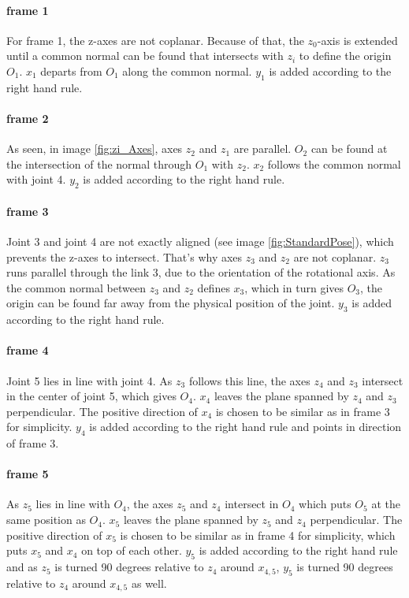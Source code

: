 \paragraph{frame 1}
For frame 1, the z-axes are not coplanar. 
Because of that, the  $z_0$-axis is extended until a common normal can be found that intersects with $z_i$ to define the origin $O_1$.
$x_1$ departs from $O_1$ along the common normal.
$y_1$ is added according to the right hand rule.

\paragraph{frame 2}
As seen, in image \ref{fig:zi_Axes}, axes $z_2$ and $z_1$ are parallel. $O_2$ can be found at the intersection of the normal through $O_1$ with $z_2$. $x_2$ follows the common normal with joint 4.
$y_2$ is added according to the right hand rule.

\paragraph{frame 3}
Joint 3 and joint 4 are not exactly aligned (see image \ref{fig:StandardPose}), which prevents the z-axes to intersect. That's why axes $z_3$ and $z_2$ are not coplanar. 
$z_3$ runs parallel through the link 3, due to the orientation of the rotational axis.
As the common normal between $z_3$ and $z_2$ defines $x_3$, which in turn gives $O_3$, the origin can be found far away from the physical position of the joint.
$y_3$ is added according to the right hand rule.

\paragraph{frame 4}
Joint 5 lies in line with joint 4.
As $z_3$ follows this line, the axes  $z_4$ and $z_3$ intersect in the center of joint 5, which gives $O_4$. 
$x_4$ leaves the plane spanned by  $z_4$ and $z_3$ perpendicular.
The positive direction of $x_4$ is chosen to be similar as in frame 3 for simplicity.
$y_4$ is added according to the right hand rule and points in direction of frame 3.

\paragraph{frame 5}
As $z_5$ lies  in line with $O_4$, the axes  $z_5$ and $z_4$ intersect in $O_4$ which puts $O_5$ at the same position as $O_4$.
$x_5$ leaves the plane spanned by  $z_5$ and $z_4$ perpendicular.
The positive direction of $x_5$ is chosen to be similar as in frame 4 for simplicity, which puts $x_5$ and $x_4$ on top of each other. 
$y_5$ is added according to the right hand rule and as $z_5$ is turned 90 degrees relative to $z_4$ around $x_{4,5}$, $y_5$ is turned 90 degrees relative to $z_4$ around $x_{4,5}$ as well.

